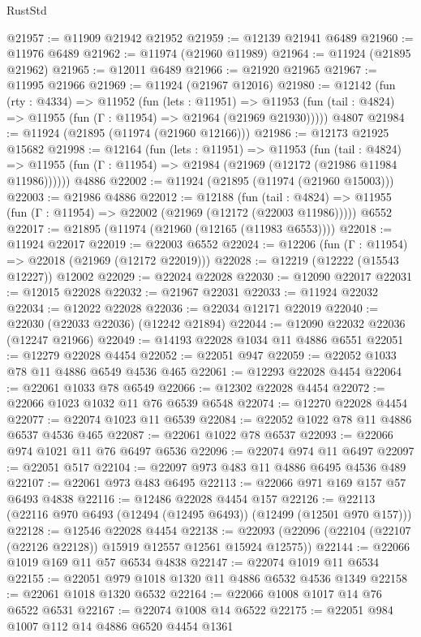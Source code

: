 \begin{lexlean}{RustStd}
\begin{coremodule}
@21957 := @11909 @21942 @21952
@21959 := @12139 @21941 @6489
@21960 := @11976 @6489
@21962 := @11974 (@21960 @11989)
@21964 := @11924 (@21895 @21962)
@21965 := @12011 @6489
@21966 := @21920 @21965
@21967 := @11995 @21966
@21969 := @11924 (@21967 @12016)
@21980 := @12142
    (fun (rty : @4334) =>
    @11952
      (fun (lets : @11951) =>
      @11953 (fun (tail : @4824) => @11955 (fun (Γ : @11954) => @21964 (@21969 @21930)))))
    @4807
@21984 := @11924 (@21895 (@11974 (@21960 @12166)))
@21986 := @12173 @21925 @15682
@21998 := @12164
    (fun (lets : @11951) =>
    @11953
      (fun (tail : @4824) =>
      @11955 (fun (Γ : @11954) => @21984 (@21969 (@12172 (@21986 @11984 @11986))))))
    @4886
@22002 := @11924 (@21895 (@11974 (@21960 @15003)))
@22003 := @21986 @4886
@22012 := @12188
    (fun (tail : @4824) => @11955 (fun (Γ : @11954) => @22002 (@21969 (@12172 (@22003 @11986)))))
    @6552
@22017 := @21895 (@11974 (@21960 (@12165 (@11983 @6553))))
@22018 := @11924 @22017
@22019 := @22003 @6552
@22024 := @12206 (fun (Γ : @11954) => @22018 (@21969 (@12172 @22019)))
@22028 := @12219 (@12222 (@15543 @12227)) @12002
@22029 := @22024 @22028
@22030 := @12090 @22017
@22031 := @12015 @22028
@22032 := @21967 @22031
@22033 := @11924 @22032
@22034 := @12022 @22028
@22036 := @22034 @12171 @22019
@22040 := @22030 (@22033 @22036) (@12242 @21894)
@22044 := @12090 @22032 @22036 (@12247 @21966)
@22049 := @14193 @22028 @1034 @11 @4886 @6551
@22051 := @12279 @22028 @4454
@22052 := @22051 @947
@22059 := @22052 @1033 @78 @11 @4886 @6549 @4536 @465
@22061 := @12293 @22028 @4454
@22064 := @22061 @1033 @78 @6549
@22066 := @12302 @22028 @4454
@22072 := @22066 @1023 @1032 @11 @76 @6539 @6548
@22074 := @12270 @22028 @4454
@22077 := @22074 @1023 @11 @6539
@22084 := @22052 @1022 @78 @11 @4886 @6537 @4536 @465
@22087 := @22061 @1022 @78 @6537
@22093 := @22066 @974 @1021 @11 @76 @6497 @6536
@22096 := @22074 @974 @11 @6497
@22097 := @22051 @517
@22104 := @22097 @973 @483 @11 @4886 @6495 @4536 @489
@22107 := @22061 @973 @483 @6495
@22113 := @22066 @971 @169 @157 @57 @6493 @4838
@22116 := @12486 @22028 @4454 @157
@22126 := @22113 (@22116 @970 @6493 (@12494 (@12495 @6493)) (@12499 (@12501 @970 @157)))
@22128 := @12546 @22028 @4454
@22138 := @22093 (@22096 (@22104 (@22107 (@22126 @22128)) @15919 @12557 @12561 @15924 @12575))
@22144 := @22066 @1019 @169 @11 @57 @6534 @4838
@22147 := @22074 @1019 @11 @6534
@22155 := @22051 @979 @1018 @1320 @11 @4886 @6532 @4536 @1349
@22158 := @22061 @1018 @1320 @6532
@22164 := @22066 @1008 @1017 @14 @76 @6522 @6531
@22167 := @22074 @1008 @14 @6522
@22175 := @22051 @984 @1007 @112 @14 @4886 @6520 @4454 @1361

\end{coremodule}
\end{lexlean}
